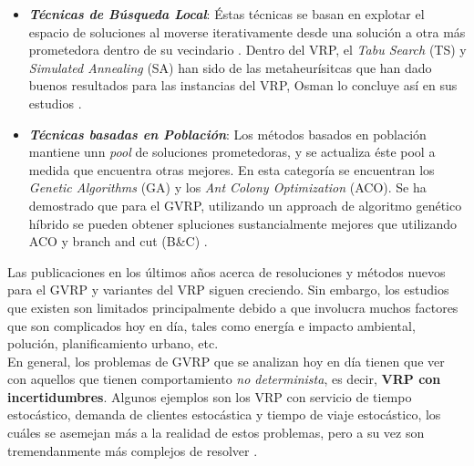 \documentclass[letter, 10pt]{article}
\begin{document}
\begin{itemize}
    \item \textbf{\emph{Técnicas de Búsqueda Local}}: Éstas técnicas se basan en explotar el espacio de soluciones al moverse iterativamente desde una solución a otra más prometedora dentro de su vecindario \cite{LIN20141118}. Dentro del VRP, el \emph{Tabu Search} (TS) y \emph{Simulated Annealing} (SA) han sido de las metaheurísitcas que han dado buenos resultados para las instancias del VRP, Osman lo concluye así en sus estudios \cite{OSMAN}. 
    \item \textbf{\emph{Técnicas basadas en Población}}: Los métodos basados en población mantiene unn \emph{pool} de soluciones prometedoras, y se actualiza éste pool a medida que encuentra otras mejores. En esta categoría se encuentran los \emph{Genetic Algorithms} (GA) y los \emph{Ant Colony Optimization} (ACO). Se ha demostrado que para el GVRP, utilizando un approach de algoritmo genético híbrido se pueden obtener spluciones sustancialmente mejores que utilizando ACO y branch and cut (B\&C) \cite{10.1007/978-3-642-13803-4_15}.
\end{itemize}

Las publicaciones en los últimos años acerca de resoluciones y métodos nuevos para el GVRP y variantes del VRP siguen creciendo. Sin embargo, los estudios que existen son limitados principalmente debido a que involucra muchos factores que son complicados hoy en día, tales como energía e impacto ambiental, polución, planificamiento urbano, etc.
\\

En general, los problemas de GVRP que se analizan hoy en día tienen que ver con aquellos que tienen comportamiento \emph{no determinista}, es decir, \textbf{VRP con incertidumbres}. Algunos ejemplos son los VRP con servicio de tiempo estocástico, demanda de clientes estocástica y tiempo de viaje estocástico, los cuáles se asemejan más a la realidad de estos problemas, pero a su vez son tremendanmente más complejos de resolver \cite{LIN20141118}.

\end{document}
